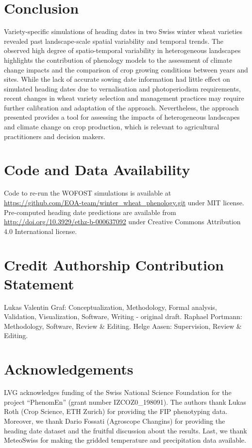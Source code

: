 \section{Conclusion}
Variety-specific simulations of heading dates in two Swiss winter wheat varieties revealed past landscape-scale spatial variability and temporal trends. The observed high degree of spatio-temporal variability in heterogeneous landscapes highlights the contribution of phenology models to the assessment of climate change impacts and the comparison of crop growing conditions between years and sites. While the lack of accurate sowing date information had little effect on simulated heading dates due to vernalisation and photoperiodism requirements, recent changes in wheat variety selection and management practices may require further calibration and adaptation of the approach. Nevertheless, the approach presented provides a tool for assessing the impacts of heterogeneous landscapes and climate change on crop production, which is relevant to agricultural practitioners and decision makers.

\section*{Code and Data Availability}
Code to re-run the \gls{WOFOST} simulations is available at \url{https://github.com/EOA-team/winter_wheat_phenology.git} under MIT license. Pre-computed heading date predictions are available from \url{http://doi.org/10.3929/ethz-b-000637092} under Creative Commons Attribution 4.0 International license.

\section*{Credit Authorship Contribution Statement}
Lukas Valentin Graf: Conceptualization, Methodology, Formal analysis, Validation, Visualization, Software, Writing - original draft. Raphael Portmann: Methodology, Software, Review \& Editing. Helge Aasen:  Supervision, Review \& Editing.

\section*{Acknowledgements}
LVG acknowledges funding of the Swiss National Science Foundation for the project “PhenomEn” (grant number IZCOZ0\_198091). The authors thank Lukas Roth (Crop Science, ETH Zurich) for providing the FIP phenotyping data. Moreover, we thank Dario Fossati (Agroscope Changins) for providing the heading date dataset and the fruitful discussion about the results. Last, we thank MeteoSwiss for making the gridded temperature and precipitation data available.